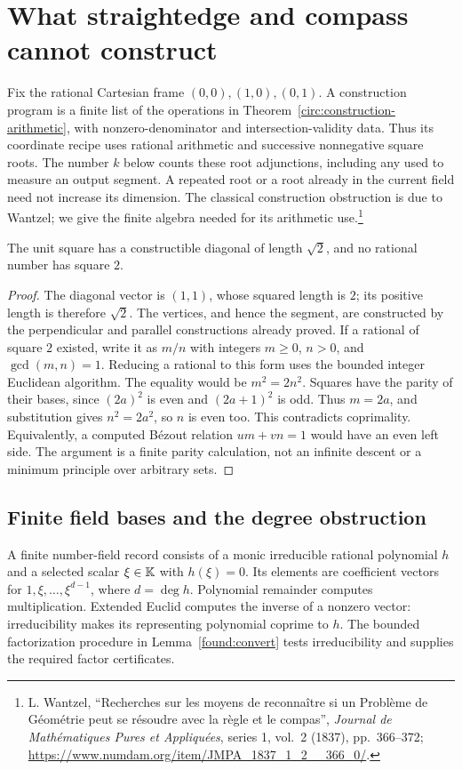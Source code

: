 \section{What straightedge and compass cannot construct}
\label{sec:obstructions}
Fix the rational Cartesian frame $(0,0),(1,0),(0,1)$.  A construction
program is a finite list of the operations in
Theorem~\ref{circ:construction-arithmetic}, with nonzero-denominator and
intersection-validity data.  Thus its coordinate recipe uses rational
arithmetic and successive nonnegative square roots.  The number $k$ below
counts these root adjunctions, including any used to measure an output
segment.  A repeated root or a root already in the current field need not
increase its dimension.  The classical construction obstruction is due
to Wantzel; we give the finite algebra needed for its arithmetic use.\footnote{
L. Wantzel, ``Recherches sur les moyens de reconna\^itre si un Probl\`eme
de G\'eom\'etrie peut se r\'esoudre avec la r\`egle et le compas'',
\emph{Journal de Math\'ematiques Pures et Appliqu\'ees}, series 1,
vol.~2 (1837), pp.~366--372;
\url{https://www.numdam.org/item/JMPA_1837_1_2__366_0/}.}

\begin{theorem}
\label{obs:diagonal}
The unit square has a constructible diagonal of length $\sqrt2$, and no
rational number has square $2$.
\end{theorem}
\begin{proof}
The diagonal vector is $(1,1)$, whose squared length is $2$; its positive
length is therefore $\sqrt2$.  The vertices, and hence the segment, are
constructed by the perpendicular and parallel constructions already proved.
If a rational of square $2$ existed, write it as $m/n$ with integers
$m\ge0$, $n>0$, and $\gcd(m,n)=1$.  Reducing a rational to this form
uses the bounded integer Euclidean algorithm.  The equality would be
$m^2=2n^2$.  Squares have the parity of their bases, since
$(2a)^2$ is even and $(2a+1)^2$ is odd.  Thus $m=2a$, and substitution
gives $n^2=2a^2$, so $n$ is even too.  This contradicts coprimality.
Equivalently, a computed B\'ezout relation $um+vn=1$ would have an even
left side.  The argument is a finite parity calculation, not an infinite
descent or a minimum principle over arbitrary sets.
\end{proof}

\subsection{Finite field bases and the degree obstruction}
A finite number-field record consists of a monic irreducible rational
polynomial $h$ and a selected scalar $\xi\in\mathbb K$ with $h(\xi)=0$.
Its elements are coefficient vectors for $1,\xi,\ldots,\xi^{d-1}$,
where $d=\deg h$.  Polynomial remainder computes multiplication.
Extended Euclid computes the inverse of a nonzero vector: irreducibility
makes its representing polynomial coprime to $h$.
The bounded factorization procedure in Lemma~\ref{found:convert} tests
irreducibility and supplies the required factor certificates.

